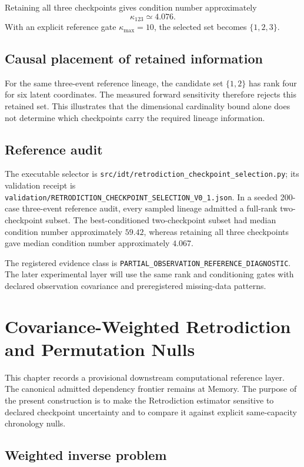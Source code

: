 \documentclass[11pt]{book}
\begin{document}
Retaining all three checkpoints gives condition number approximately
\[
\boxed{\kappa_{123}\simeq4.076.}
\]
With an explicit reference gate \(\kappa_{\max}=10\), the selected set becomes \(\{1,2,3\}\).

\section{Causal placement of retained information}

For the same three-event reference lineage, the candidate set \(\{1,2\}\) has rank four for six latent coordinates. The measured forward sensitivity therefore rejects this retained set. This illustrates that the dimensional cardinality bound alone does not determine which checkpoints carry the required lineage information.

\section{Reference audit}

The executable selector is \texttt{src/idt/retrodiction\_checkpoint\_selection.py}; its validation receipt is \texttt{validation/RETRODICTION\_CHECKPOINT\_SELECTION\_V0\_1.json}. In a seeded 200-case three-event reference audit, every sampled lineage admitted a full-rank two-checkpoint subset. The best-conditioned two-checkpoint subset had median condition number approximately \(59.42\), whereas retaining all three checkpoints gave median condition number approximately \(4.067\).

The registered evidence class is \texttt{PARTIAL\_OBSERVATION\_REFERENCE\_DIAGNOSTIC}. The later experimental layer will use the same rank and conditioning gates with declared observation covariance and preregistered missing-data patterns.

\chapter{Covariance-Weighted Retrodiction and Permutation Nulls}

This chapter records a provisional downstream computational reference layer. The canonical admitted dependency frontier remains at Memory. The purpose of the present construction is to make the Retrodiction estimator sensitive to declared checkpoint uncertainty and to compare it against explicit same-capacity chronology nulls.

\section{Weighted inverse problem}
\end{document}
